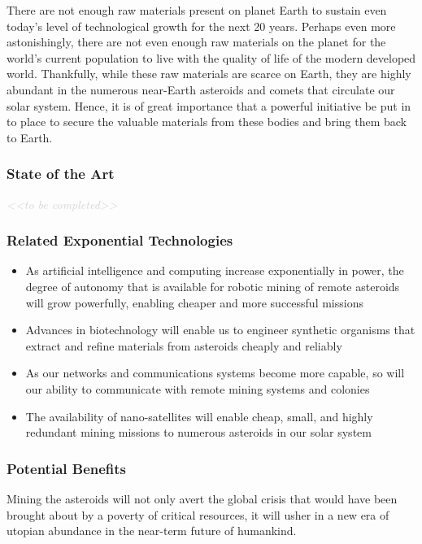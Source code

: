 \documentclass[letter,11pt]{article}
\newcommand{\todo}[1]{\textcolor{lightgray}{\textit{<<#1>>}}}
\newcommand{\tbc}{\begin{center} \todo{to be completed} \end{center}}
\newcommand{\tbcsubsubsection}[1]{ \refstepcounter{subsubsection}%
  \subsubsection*{\thesubsubsection \quad #1} \tbc}
\begin{document}
There are not enough raw materials present on planet Earth to sustain even
today's level of technological growth for the next 20 years\cite{Cohen2007}.
Perhaps even more astonishingly, there are not even enough raw materials on the
planet for the world's current population to live with the quality of life of
the modern developed world\cite{Gordon2006}.  Thankfully, while these raw
materials are scarce on Earth, they are highly abundant in the numerous
near-Earth asteroids and comets that circulate our solar system.  Hence, it is
of great importance that a powerful initiative be put in to place to secure the
valuable materials from these bodies and bring them back to Earth.

\tbcsubsubsection{State of the Art}

\subsubsection{Related Exponential Technologies}
\begin{itemize}
	\item As artificial intelligence and computing increase exponentially in
		power, the degree of autonomy that is available for robotic mining of
		remote asteroids will grow powerfully, enabling cheaper and more successful
		missions
	\item Advances in biotechnology will enable us to engineer synthetic
		organisms that extract and refine materials from asteroids cheaply and
		reliably
	\item As our networks and communications systems become more capable, so will
		our ability to communicate with remote mining systems and colonies
	\item The availability of nano-satellites will enable cheap, small, and
		highly redundant mining missions to numerous asteroids in our solar system
\end{itemize}

\subsubsection{Potential Benefits}

Mining the asteroids will not only avert the global crisis that would have been
brought about by a poverty of critical resources, it will usher in a new era of
utopian abundance in the near-term future of humankind.
\end{document}

